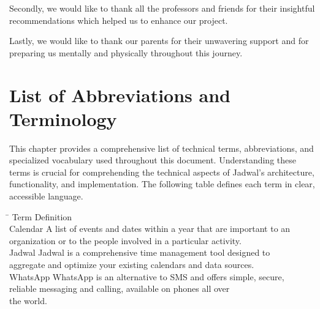 \documentclass[12pt,a4paper,twoside]{report}
\begin{document}
\begin{singlespace}
\begin{justify}
        Secondly, we would like to thank all the professors and friends for their insightful recommendations which helped us to enhance our project.

        Lastly, we would like to thank our parents for their unwavering support and for preparing us mentally and physically throughout this journey.
    \end{justify}

    \newpage

    \tableofcontents

    \listoffigures

    \listoftables

    \chapter*{List of Abbreviations and Terminology}

    This chapter provides a comprehensive list of technical terms, abbreviations, and specialized vocabulary used throughout this document. Understanding these terms is crucial for comprehending the technical aspects of Jadwal's architecture, functionality, and implementation. The following table defines each term in clear, accessible language.

    \begin{tabbing}
        \hspace{1.5in} \= \kill
        Term \> Definition \\[0.5em]

        Calendar \> A list of events and dates within a year that are important to an \\
        \> organization or to the people involved in a particular activity. \cite{def:calendar} \\[0.5em]

        Jadwal \> Jadwal is a comprehensive time management tool designed to \\
        \> aggregate and optimize your existing calendars and data sources. \\[0.5em]

        WhatsApp \> WhatsApp is an alternative to SMS and offers simple, secure, \\
        \> reliable messaging and calling, available on phones all over \\
        \> the world. \cite{whatsapp-about} \\[0.5em]


\end{tabbing}
\end{singlespace}
\end{document}
